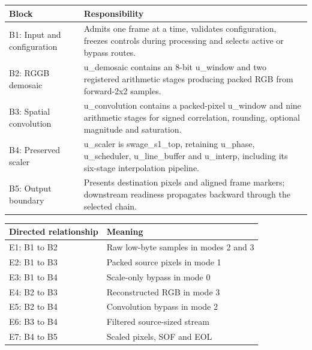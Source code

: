 \documentclass[11pt,a4paper]{article}
\begin{document}
{\small\renewcommand{\arraystretch}{1.18}\begin{longtable}{@{}L{0.24\textwidth}|L{0.7\textwidth}@{}}\toprule

\textbf{Block} & \textbf{Responsibility}\\\midrule\endhead

B1: Input and configuration & Admits one frame at a time,\allowbreak{} validates configuration,\allowbreak{} freezes controls during processing and selects active or bypass routes.\\[2pt]\hline

B2: RGGB demosaic & u\_\allowbreak{}demosaic contains an 8-bit u\_\allowbreak{}window and two registered arithmetic stages producing packed RGB from forward-2x2 samples.\\[2pt]\hline

B3: Spatial convolution & u\_\allowbreak{}convolution contains a packed-pixel u\_\allowbreak{}window and nine arithmetic stages for signed correlation,\allowbreak{} rounding,\allowbreak{} optional magnitude and saturation.\\[2pt]\hline

B4: Preserved scaler & u\_\allowbreak{}scaler is swage\_\allowbreak{}s1\_\allowbreak{}top,\allowbreak{} retaining u\_\allowbreak{}phase,\allowbreak{} u\_\allowbreak{}scheduler,\allowbreak{} u\_\allowbreak{}line\_\allowbreak{}buffer and u\_\allowbreak{}interp,\allowbreak{} including its six-stage interpolation pipeline.\\[2pt]\hline

B5: Output boundary & Presents destination pixels and aligned frame markers; downstream readiness propagates backward through the selected chain.\\[2pt]\hline

\bottomrule\end{longtable}}

{\small\renewcommand{\arraystretch}{1.18}\begin{longtable}{@{}L{0.24\textwidth}|L{0.7\textwidth}@{}}\toprule

\textbf{Directed relationship} & \textbf{Meaning}\\\midrule\endhead

E1: B1 to B2 & Raw low-byte samples in modes 2 and 3\\[2pt]\hline

E2: B1 to B3 & Packed source pixels in mode 1\\[2pt]\hline

E3: B1 to B4 & Scale-only bypass in mode 0\\[2pt]\hline

E4: B2 to B3 & Reconstructed RGB in mode 3\\[2pt]\hline

E5: B2 to B4 & Convolution bypass in mode 2\\[2pt]\hline

E6: B3 to B4 & Filtered source-sized stream\\[2pt]\hline

E7: B4 to B5 & Scaled pixels,\allowbreak{} SOF and EOL\\[2pt]\hline

\bottomrule\end{longtable}}
\end{document}
